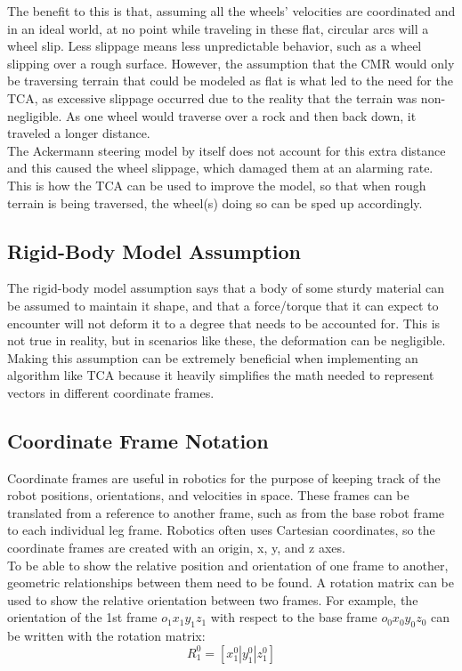 The benefit to this is that, assuming all the wheels' velocities are coordinated and in an ideal world, at no point while traveling in these flat, circular arcs will a wheel slip. Less slippage means less unpredictable behavior, such as a wheel slipping over a rough surface. However, the assumption that the \ac{CMR} would only be traversing terrain that could be modeled as flat is what led to the need for the \ac{TCA}, as excessive slippage occurred due to the reality that the terrain was non-negligible. As one wheel would traverse over a rock and then back down, it traveled a longer distance. \\

The Ackermann steering model by itself does not account for this extra distance and this caused the wheel slippage, which damaged them at an alarming rate. This is how the \ac{TCA} can be used to improve the model, so that when rough terrain is being traversed, the wheel(s) doing so can be sped up accordingly.

\subsection{Rigid-Body Model Assumption}\label{traction_control:discussion:rigid-body}
The rigid-body model assumption says that a body of some sturdy material can be assumed to maintain it shape, and that a force/torque that it can expect to encounter will not deform it to a degree that needs to be accounted for. This is not true in reality, but in scenarios like these, the deformation can be negligible. \\

Making this assumption can be extremely beneficial when implementing an algorithm like \ac{TCA} because it heavily simplifies the math needed to represent vectors in different coordinate frames.

\subsection{Coordinate Frame Notation}
Coordinate frames are useful in robotics for the purpose of keeping track of the robot positions, orientations, and velocities in space. These frames can be translated from  a reference to another frame, such as from the base robot frame to each individual leg frame. Robotics often uses Cartesian coordinates, so the coordinate frames are created with an origin, x, y, and z axes. \\

To be able to show the relative position and orientation of one frame to another, geometric relationships between them need to be found. A rotation matrix can be used to show the relative orientation between two frames. For example, the orientation of the 1st frame $o_{1}x_{1}y_{1}z_{1}$ with respect to the base frame $o_{0}x_{0}y_{0}z_{0}$ can be written with the rotation matrix:
\begin{equation}\label{traction_control:discussion:r01}
	R^{0}_{1} = [x^{0}_{1} | y^{0}_{1} | z^{0}_{1}]
\end{equation}

